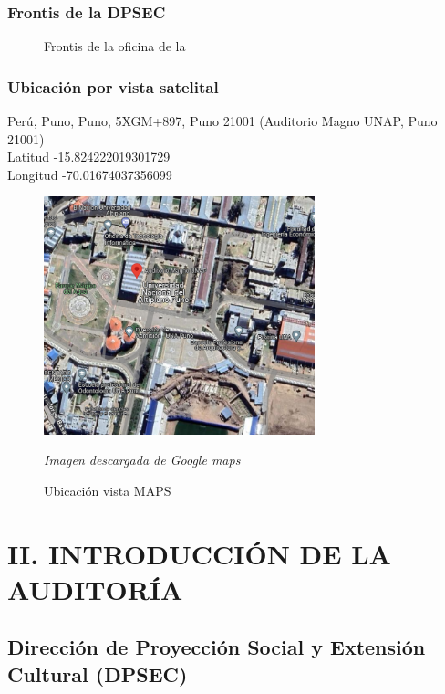 \documentclass[12pt,a4paper]{article}
\begin{document}
\newpage
\subsubsection*{Frontis de la DPSEC}
\begin{figure}[!htb]
    \centering
    \caption{Frontis de la oficina de la \dpsec}
\end{figure}

\newpage
\subsubsection*{Ubicación por vista satelital}
Perú, Puno, Puno, 5XGM+897, Puno 21001 (Auditorio Magno UNAP, Puno 21001)
\\
Latitud -15.824222019301729 \\
Longitud -70.01674037356099



\begin{figure}[!htb]
    \centering
    \includegraphics[width=0.7\textwidth]{images/ubicacion.png}
    \caption{Ubicación vista MAPS } \par \textit{Imagen descargada de Google maps}

\end{figure}


\newpage
\section{II. INTRODUCCIÓN DE LA AUDITORÍA}
\subsection*{Dirección de Proyección Social y Extensión Cultural (DPSEC)}
\end{document}
